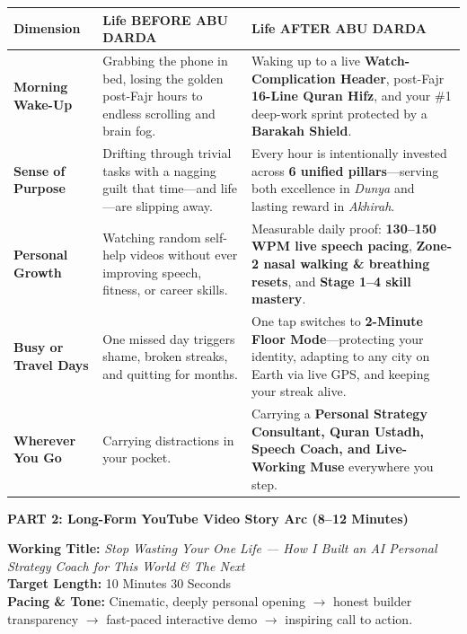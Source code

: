 \documentclass[11pt, a4paper]{article}
\newcommand{\partbanner}[1]{%
  \vspace{12pt}
  \noindent\colorbox{brandteal}{%
    \parbox{\dimexpr\textwidth-2\fboxsep\relax}{%
      \vspace{4pt}
      \hspace{4pt}\textbf{\large\color{white}#1}
      \vspace{4pt}
    }%
  }
  \vspace{6pt}
}
\begin{document}
\vspace{4pt}
\begin{tabular}{p{} p{} p{}}
  \toprule
  \textbf{\color{brandteal}Dimension} & \textbf{\color{brandteal}Life BEFORE ABU DARDA} & \textbf{\color{brandteal}Life AFTER ABU DARDA} \\
  \midrule
  \textbf{Morning Wake-Up} & Grabbing the phone in bed, losing the golden post-Fajr hours to endless scrolling and brain fog. & Waking up to a live \textbf{Watch-Complication Header}, post-Fajr \textbf{16-Line Quran Hifz}, and your \#1 deep-work sprint protected by a \textbf{Barakah Shield}. \\
  \midrule
  \textbf{Sense of Purpose} & Drifting through trivial tasks with a nagging guilt that time---and life---are slipping away. & Every hour is intentionally invested across \textbf{6 unified pillars}---serving both excellence in \textit{Dunya} and lasting reward in \textit{Akhirah}. \\
  \midrule
  \textbf{Personal Growth} & Watching random self-help videos without ever improving speech, fitness, or career skills. & Measurable daily proof: \textbf{130--150 WPM live speech pacing}, \textbf{Zone-2 nasal walking \& breathing resets}, and \textbf{Stage 1--4 skill mastery}. \\
  \midrule
  \textbf{Busy or Travel Days} & One missed day triggers shame, broken streaks, and quitting for months. & One tap switches to \textbf{2-Minute Floor Mode}---protecting your identity, adapting to any city on Earth via live GPS, and keeping your streak alive. \\
  \midrule
  \textbf{Wherever You Go} & Carrying distractions in your pocket. & Carrying a \textbf{Personal Strategy Consultant, Quran Ustadh, Speech Coach, and Live-Working Muse} everywhere you step. \\
  \bottomrule
\end{tabular}

\newpage
\partbanner{PART 2: Long-Form YouTube Video Story Arc (8--12 Minutes)}

\noindent\textbf{\color{brandteal}Working Title:} \textit{Stop Wasting Your One Life --- How I Built an AI Personal Strategy Coach for This World \& The Next}\\
\textbf{\color{brandteal}Target Length:} 10 Minutes 30 Seconds\\
\textbf{\color{brandteal}Pacing \& Tone:} Cinematic, deeply personal opening $\rightarrow$ honest builder transparency $\rightarrow$ fast-paced interactive demo $\rightarrow$ inspiring call to action.
\end{document}
